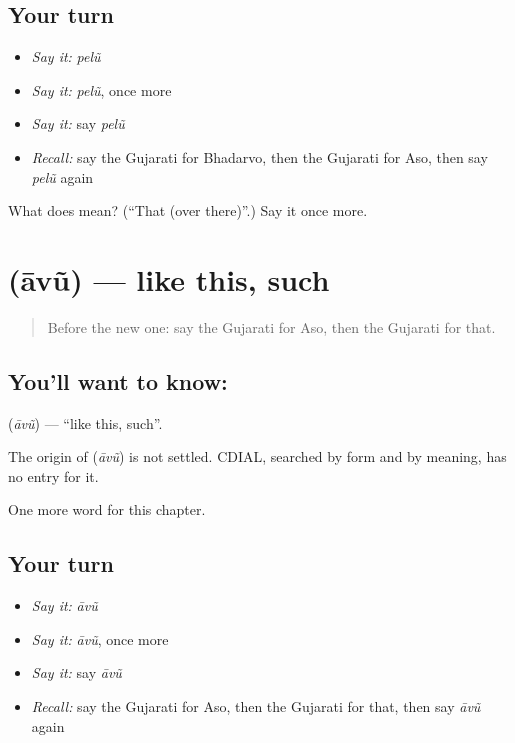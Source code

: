 \subsection*{Your turn}
\begin{itemize}
\raggedright
  \item \emph{Say it:} \emph{pelũ}
  \item \emph{Say it:} \emph{pelũ}, once more
  \item \emph{Say it:} say \emph{pelũ}
  \item \emph{Recall:} say the Gujarati for Bhadarvo, then the Gujarati for Aso, then say \emph{pelũ} again
\end{itemize}

\begin{tcolorbox}[breakable,colback=teal!4,colframe=teal!35!black,title={Before you move on}]
What does  mean? (\textquotedblleft{}That (over there)\textquotedblright{}.) Say it once more.
\end{tcolorbox}
\section[\texorpdfstring{\gu{આવું} (āvũ)}{આવું (āvũ)}]{ (āvũ) — like this, such}

\label{lesson:GU-C99-avu}



\begin{quote}
Before the new one: say the Gujarati for Aso, then the Gujarati for that.
\end{quote}

\subsection*{You'll want to know: }
\textbf{} (\emph{āvũ}) — \textquotedblleft{}like this, such\textquotedblright{}.

\begin{cousinweb}
The origin of \textbf{} (\emph{āvũ}) is not settled. CDIAL, searched by form and by meaning, has no entry for it.
\end{cousinweb}

\begin{grammarlens}[title={What you've built}]
One more word for this chapter.
\end{grammarlens}

\subsection*{Your turn}
\begin{itemize}
\raggedright
  \item \emph{Say it:} \emph{āvũ}
  \item \emph{Say it:} \emph{āvũ}, once more
  \item \emph{Say it:} say \emph{āvũ}
  \item \emph{Recall:} say the Gujarati for Aso, then the Gujarati for that, then say \emph{āvũ} again
\end{itemize}

